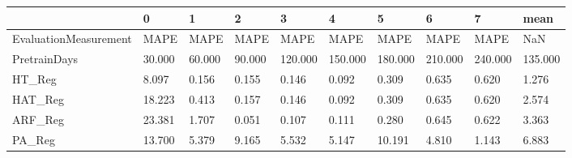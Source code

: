 \begin{tabular}{llllllllll}
\toprule
{} &      0 &      1 &      2 &       3 &       4 &       5 &       6 &       7 &    mean \\
\midrule
EvaluationMeasurement &   MAPE &   MAPE &   MAPE &    MAPE &    MAPE &    MAPE &    MAPE &    MAPE &     NaN \\
PretrainDays          & 30.000 & 60.000 & 90.000 & 120.000 & 150.000 & 180.000 & 210.000 & 240.000 & 135.000 \\
HT\_Reg                &  8.097 &  0.156 &  0.155 &   0.146 &   0.092 &   0.309 &   0.635 &   0.620 &   1.276 \\
HAT\_Reg               & 18.223 &  0.413 &  0.157 &   0.146 &   0.092 &   0.309 &   0.635 &   0.620 &   2.574 \\
ARF\_Reg               & 23.381 &  1.707 &  0.051 &   0.107 &   0.111 &   0.280 &   0.645 &   0.622 &   3.363 \\
PA\_Reg                & 13.700 &  5.379 &  9.165 &   5.532 &   5.147 &  10.191 &   4.810 &   1.143 &   6.883 \\
\bottomrule
\end{tabular}
